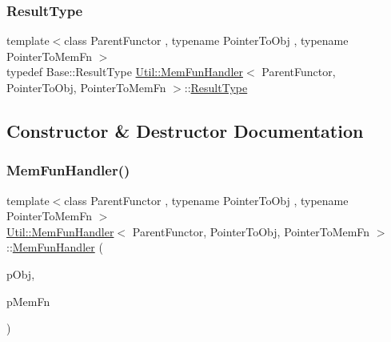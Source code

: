 \subsubsection{\texorpdfstring{ResultType}{ResultType}\hspace{0.1cm}{\footnotesize\ttfamily [2/2]}}
{\footnotesize\ttfamily template$<$class Parent\+Functor , typename Pointer\+To\+Obj , typename Pointer\+To\+Mem\+Fn $>$ \\
typedef Base\+::\+Result\+Type \mbox{\hyperlink{classUtil_1_1MemFunHandler}{Util\+::\+Mem\+Fun\+Handler}}$<$ Parent\+Functor, Pointer\+To\+Obj, Pointer\+To\+Mem\+Fn $>$\+::\mbox{\hyperlink{classUtil_1_1MemFunHandler_a093690dcced95ad48c5429e50006c83e}{Result\+Type}}}



\subsection{Constructor \& Destructor Documentation}
\mbox{\label{classUtil_1_1MemFunHandler_af946fcda2a7e2d785062d6bb5f544b76}} 
\subsubsection{\texorpdfstring{MemFunHandler()}{MemFunHandler()}\hspace{0.1cm}{\footnotesize\ttfamily [1/2]}}
{\footnotesize\ttfamily template$<$class Parent\+Functor , typename Pointer\+To\+Obj , typename Pointer\+To\+Mem\+Fn $>$ \\
\mbox{\hyperlink{classUtil_1_1MemFunHandler}{Util\+::\+Mem\+Fun\+Handler}}$<$ Parent\+Functor, Pointer\+To\+Obj, Pointer\+To\+Mem\+Fn $>$\+::\mbox{\hyperlink{classUtil_1_1MemFunHandler}{Mem\+Fun\+Handler}} (\begin{DoxyParamCaption}\item[{const Pointer\+To\+Obj \&}]{p\+Obj,  }\item[{Pointer\+To\+Mem\+Fn}]{p\+Mem\+Fn }\end{DoxyParamCaption})\hspace{0.3cm}{\ttfamily [inline]}}

